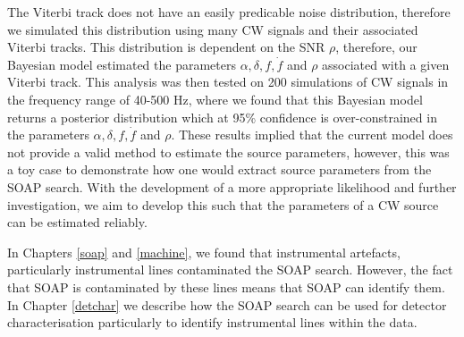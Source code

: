 The Viterbi track does not have an easily predicable noise distribution,
therefore we simulated this distribution using many \gls{CW} signals and their
associated Viterbi tracks.  This distribution is dependent on the \gls{SNR}
$\rho$, therefore, our Bayesian model estimated the parameters $\alpha, \delta,
f, \dot{f}$ and $\rho$ associated with a given Viterbi track.  This analysis
was then tested on 200 simulations of \gls{CW} signals in the frequency range
of 40-500 Hz, where we found that this Bayesian model returns a posterior
distribution which at 95\% confidence is over-constrained in the parameters
$\alpha,\delta,f,\dot{f}$ and $\rho$.  These results implied that the current
model does not provide a valid method to estimate the source parameters,
however, this was a toy case to demonstrate how one would extract source
parameters from the SOAP search.  With the development of a more appropriate
likelihood and further investigation, we aim to develop this such that the
parameters of a \gls{CW} source can be estimated reliably.~

\bigskip

In Chapters \ref{soap} and \ref{machine}, we found that instrumental artefacts,
particularly instrumental lines contaminated the SOAP search.  However, the
fact that SOAP is contaminated by these lines means that SOAP can identify
them.  In Chapter \ref{detchar} we describe how the SOAP search can be used for
detector characterisation particularly to identify instrumental lines within
the data.

